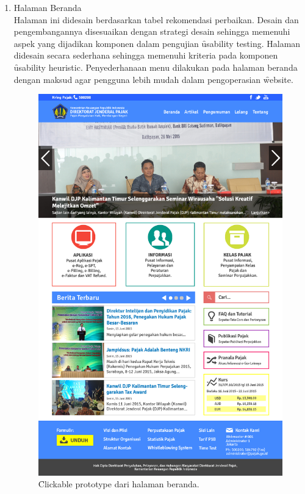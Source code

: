 \begin{enumerate}
	\item Halaman Beranda \\
	Halaman ini didesain berdasarkan tabel rekomendasi perbaikan. Desain dan pengembangannya disesuaikan dengan strategi desain sehingga memenuhi aspek yang dijadikan komponen dalam pengujian \f{usability testing}. Halaman didesain secara sederhana sehingga memenuhi kriteria pada komponen \f{usability heuristic}. Penyederhanaan menu dilakukan pada halaman beranda dengan maksud agar pengguna lebih mudah dalam pengoperasian \f{website}.
	\begin{figure}
		\centering
		\includegraphics[width=\textwidth]
		{pics/beranda.jpg}
		\caption{\f{Clickable prototype} dari halaman beranda.}

\end{figure}
\end{enumerate}

